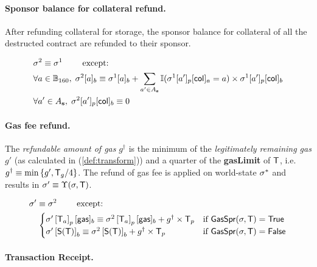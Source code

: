 \paragraph{Sponsor balance for collateral refund.}

After refunding collateral for storage, the sponsor balance for collateral of all the destructed contract are refunded to their sponsor.

\begin{align}
	&\mathbf{\sigma}^2  \equiv \mathbf{\sigma}^1 \qquad \mbox{  except:}\\
	&\forall a \in \mathbb{B}_{160},\;  \mathbf{\sigma}^2[a]_b\equiv \mathbf{\sigma}^1[a]_b + \sum_{a'\in A_{\bf s}} \mathbb{I}(\mathbf{\sigma}^1[a']_p[{\sf col}]_a=a)\times \mathbf{\sigma}^1[a']_p[{\sf col}]_b \\
	&\forall a' \in A_{\bf s},\; \mathbf{\sigma}^2[a']_p[{\sf col}]_b\equiv 0
\end{align}


\paragraph{Gas fee refund.}

The \emph{refundable amount of gas} $g^{\dagger}$ is the minimum of the \emph{legitimately remaining gas} $g'$ (as calculated in (\ref{def:transform})) and a quarter of the \textbf{gasLimit} of $\textsf{T}$,
	i.e. $g^{\dagger}\equiv \min{\left \{{g', \textsf{T}_g/4} \right \}}$.
The refund of gas fee is applied on world-state $\mathbf{\sigma}^{*}$ and results in $\mathbf{\sigma}'\equiv \Upsilon(\mathbf{\sigma},\textsf{T})$.

\begin{align}
	& \mathbf{\sigma}'  \equiv \mathbf{\sigma}^2 \qquad \mbox{  except:}\\
	& \quad \begin{cases} 
		\mathbf{\sigma}'\left[\textsf{T}_a\right]_p[{\sf gas}]_b \equiv \mathbf{\sigma}^2\left[\textsf{T}_a\right]_p[{\sf gas}]_b+g^{\dagger}\times \textsf{T}_p 
		& \mbox{if $\mathsf{GasSpr}(\mathbf{\sigma},\textsf{T})=\mathsf{True}$}\\
		\mathbf{\sigma}' \left[\mathsf{S}{\left({\textsf{T}} \right)}\right]_b \equiv \mathbf{\sigma}^2\left[\mathsf{S}{\left({\textsf{T}} \right)}\right]_b + g^{\dagger}\times \textsf{T}_p 
		& \mbox{if $\mathsf{GasSpr}(\mathbf{\sigma},\textsf{T})=\mathsf{False}$}
	\end{cases} 
\end{align}

\paragraph{Transaction Receipt.} 

